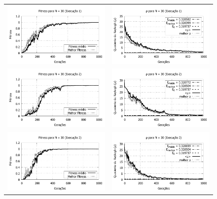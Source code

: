 		\begin{figure}[p]
	\centering
  \begin{tabular}{@{}cc@{}}
		\includegraphics[width=.40\textwidth]{figs/resultados/fitnessEL/N-30_E-1_fitness-extendido.pdf} &
    \includegraphics[width=.40\textwidth]{figs/resultados/fitnessEL/N-30_E-1_rho_extendido.pdf}   \\
		\includegraphics[width=.40\textwidth]{figs/resultados/fitnessEL/N-30_E-2_fitness-extendido.pdf} &
    \includegraphics[width=.40\textwidth]{figs/resultados/fitnessEL/N-30_E-2_rho_extendido.pdf}   \\
		\includegraphics[width=.40\textwidth]{figs/resultados/fitnessEL/N-30_E-3_fitness-extendido.pdf} &
    \includegraphics[width=.40\textwidth]{figs/resultados/fitnessEL/N-30_E-3_rho_extendido.pdf}   \\

\end{tabular}
\end{figure}
